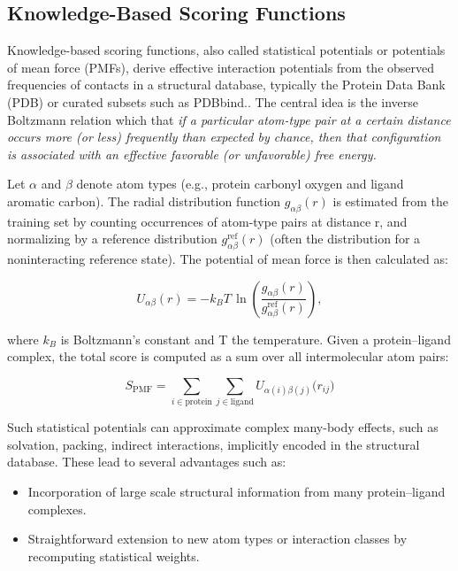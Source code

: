 \documentclass[12pt]{article}
\begin{document}
\subsection{Knowledge-Based Scoring Functions}

Knowledge-based scoring functions, also called statistical potentials or potentials of mean force (PMFs),  derive effective interaction potentials from the observed frequencies of contacts in a structural database, typically the Protein Data Bank (PDB) or curated subsets such as PDBbind.\cite{CH3_Wang2017}.  The central idea is the inverse Boltzmann relation which that \emph{if a particular atom-type pair at a certain distance occurs more (or less) frequently than expected by chance, then that configuration is associated with an effective favorable (or unfavorable) free energy.}

Let $\alpha$ and $\beta$ denote atom types (e.g., protein carbonyl oxygen and ligand aromatic carbon). The radial distribution function $g_{\alpha\beta}(r)$ is estimated from the training set by counting occurrences of atom-type pairs at distance r, and normalizing by a reference distribution $g_{\alpha\beta}^{\text{ref}}(r)$ (often the distribution for a noninteracting reference state). 
The potential of mean force is then calculated as:

\begin{equation}
U_{\alpha\beta}(r) = - k_B T \, \ln \left( \frac{g_{\alpha\beta}(r)}{g_{\alpha\beta}^{\text{ref}}(r)} \right),
\label{eq:PMF1}
\end{equation}

where $k_B$ is Boltzmann's constant and T the temperature.
Given a protein--ligand complex, the total score is computed as a sum over all intermolecular atom pairs:

\begin{equation}
S_{\text{PMF}} = \sum_{i \in \text{protein}} \sum_{j \in \text{ligand}} U_{\alpha(i)\beta(j)}\bigl(r_{ij}\bigr)
\label{eq:PMF2}
\end{equation}

Such statistical potentials can approximate complex many-body effects, such as solvation, packing, indirect interactions, implicitly encoded in the structural database. These lead to several advantages such as:
\begin{itemize}
    \item Incorporation of large scale structural information from many protein--ligand complexes.
    \item Straightforward extension to new atom types or interaction classes by recomputing statistical weights.
\end{itemize}
\end{document}
